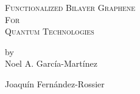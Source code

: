 \begin{titlepage}

\begin{center}

\begingroup \linespread{1,75} \selectfont
\textsc{\LARGE
Functionalized Bilayer Graphene\\
For\\
Quantum Technologies}\\[1,5cm]
\endgroup


by\\[0,5cm]
Noel A. García-Martínez\\[2,5cm]


\end{center}

Joaquín Fernández-Rossier

\vfill

\end{titlepage}
